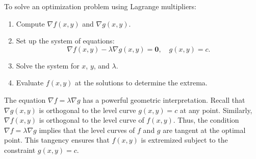 \noindent To solve an optimization problem using Lagrange multipliers:
\begin{enumerate}
    \item Compute \( \nabla f(x, y) \) and \( \nabla g(x, y) \).
    \item Set up the system of equations:
    \[
    \nabla f(x, y) - \lambda \nabla g(x, y) = \mathbf{0}, \quad g(x, y) = c.
    \]
    \item Solve the system for \( x \), \( y \), and \( \lambda \).
    \item Evaluate \( f(x, y) \) at the solutions to determine the extrema.
\end{enumerate}

\noindent The equation \( \nabla f = \lambda \nabla g \) has a powerful geometric interpretation. Recall that \( \nabla g(x, y) \) is orthogonal to the level curve \( g(x, y) = c \) at any point. Similarly, \( \nabla f(x, y) \) is orthogonal to the level curve of \( f(x, y) \). Thus, the condition \( \nabla f = \lambda \nabla g \) implies that the level curves of \( f \) and \( g \) are tangent at the optimal point. This tangency ensures that \( f(x, y) \) is extremized subject to the constraint \( g(x, y) = c \).

